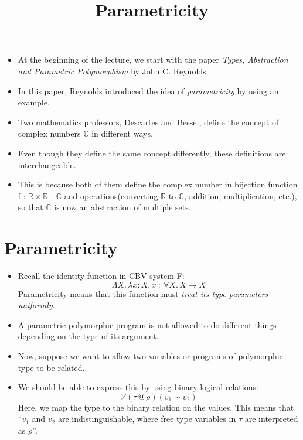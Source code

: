 \documentclass{lecturenotes}
\title{Parametricity}
\makeatletter
\newcommand{\real}{\ensuremath{\mathbb{R}}\xspace}
\newcommand{\complex}{\ensuremath{\mathbb{C}}\xspace}
\newcommand{\tabs}[3]{\ensuremath{\lambda #1 \colon #2.\,#3}}
\newcommand{\prodtype}[2]{\ensuremath{#1 \times #2}}
\newcommand{\fatype}[2]{\ensuremath{\forall #1.\,#2}}
\newcommand{\Abs}[2]{\Lambda #1.\,#2}
\newcommand{\at}{\ensuremath{\mathrel{@}}}
\makeatother
\begin{document}
\maketitle

\begin{itemize}
\item At the beginning of the lecture, we start with the paper \emph{Types, Abstraction and Parametric Polymorphism} by John C. Reynolds.
\item In this paper, Reynolds introduced the idea of \emph{parametricity} by using an example.
\item Two mathematics professors, Descartes and Bessel, define the concept of complex numbers \complex in different ways.
\item Even though they define the same concept differently, these definitions are interchangeable.
\item This is because both of them define the complex number in bijection function \textsf{f : \prodtype{\real}{\real}\ \rightarrow\ \complex}
      and operations(converting \real to \complex, addition, multiplication, etc.), so that \complex is now an abstraction of multiple sets.
\end{itemize}

\section{Parametricity}\label{sec:parametricity}

\begin{itemize}
\item Recall the identity function in CBV system F:
    \[
        \Abs{X}{\tabs{x}{X}{x}}\ :\ \fatype{X}{X \to X}
    \]
    Parametricity means that this function must \emph{treat its type parameters uniformly}.
\item A parametric polymorphic program is not allowed to do different things depending on the type of its argument.
\item Now, suppose we want to allow two variables or programs of polymorphic type to be related.
\item We should be able to express this by using binary logical relations:
    \[
        \mathcal{V}(\tau \at \rho )(v_1 \sim v_2)
    \]
    Here, we map the type to the binary relation on the values. This means that ``$v_1$ and $v_2$ are indistinguishable,
    where free type variables in $\tau$ are interpreted as $\rho$''. 
\end{itemize}
\end{document}
